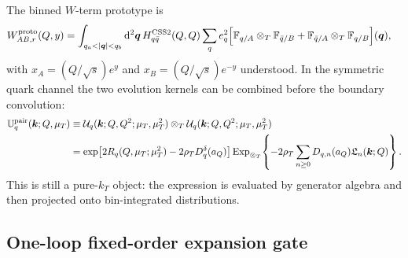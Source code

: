 \documentclass[11pt]{article}
\newcommand{\bk}{\bm{k}}
\newcommand{\bq}{\bm{q}}
\newcommand{\dd}{\mathrm{d}}
\newcommand{\ot}{\otimes_T}
\newcommand{\ExpT}{\mathrm{Exp}_{\otimes_T}}
\newcommand{\CSS}{\mathrm{CSS2}}
\begin{document}
The binned $W$-term prototype is
\begin{align}
  W_{AB,r}^{\rm proto}(Q,y)
  &=\int_{q_a<|\bq|<q_b}\dd^2\bq\,
  H_{q\bar q}^{\CSS}(Q,Q)
  \sum_q e_q^2
  \Big[
    \mathbb F_{q/A}\ot\mathbb F_{\bar q/B}
    +\mathbb F_{\bar q/A}\ot\mathbb F_{q/B}
  \Big](\bq),
  \label{eq:wproto-binned-v12}
\end{align}
with $x_A=(Q/\sqrt{s})e^y$ and $x_B=(Q/\sqrt{s})e^{-y}$ understood.  In the symmetric
quark channel the two evolution kernels can be combined before the boundary convolution:
\begin{align}
  \mathbb U_q^{\rm pair}(\bk;Q,\mu_T)
  &\equiv
  \mathcal U_q(\bk;Q,Q^2;\mu_T,\mu_T^2)
  \ot
  \mathcal U_q(\bk;Q,Q^2;\mu_T,\mu_T^2)
  \notag\\
  &=\exp\!\left[2R_q(Q,\mu_T;\mu_T^2)-2\rho_TD_q^\delta(a_Q)\right]
  \ExpT\!\left\{-2\rho_T\sum_{n\ge0}D_{q,n}(a_Q)\mathfrak L_n(\bk;Q)\right\}.
  \label{eq:wproto-pair-evolution-v12}
\end{align}
This is still a pure-$k_T$ object: the expression is evaluated by generator algebra and
then projected onto bin-integrated distributions.

\subsection{One-loop fixed-order expansion gate}
\end{document}
